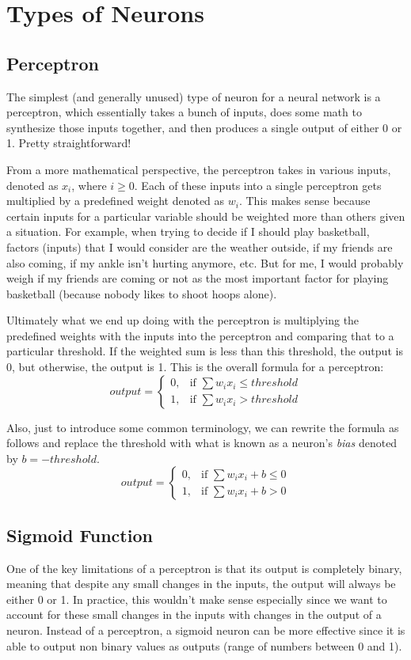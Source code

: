 \documentclass[11pt]{article}
\theoremstyle{definition}
\begin{document}
\section{Types of Neurons}
\subsection{Perceptron}
The simplest (and generally unused) type of neuron for a neural network is a perceptron, which essentially takes a bunch of inputs, does some math to synthesize those inputs together, and then produces a single output of either 0 or 1. Pretty straightforward!

From a more mathematical perspective, the perceptron takes in various inputs, denoted as \(x_i\), where \(i \geq 0\). Each of these inputs into a single perceptron gets multiplied by a predefined weight denoted as \(w_i\). This makes sense because certain inputs for a particular variable should be weighted more than others given a situation. For example, when trying to decide if I should play basketball, factors (inputs) that I would consider are the weather outside, if my friends are also coming, if my ankle isn't hurting anymore, etc. But for me, I would probably weigh if my friends are coming or not as the most important factor for playing basketball (because nobody likes to shoot hoops alone).

Ultimately what we end up doing with the perceptron is multiplying the predefined weights with the inputs into the perceptron and comparing that to a particular threshold. If the weighted sum is less than this threshold, the output is 0, but otherwise, the output is 1. This is the overall formula for a perceptron:
$$
output =
\begin{cases}
0, & \text{if   } \sum w_{i}x_i\leq threshold \\
1, & \text{if   } \sum w_{i}x_i > threshold
\end{cases}
$$

Also, just to introduce some common terminology, we can rewrite the formula as follows and replace the threshold with what is known as a neuron's \textit{bias} denoted by \(b = -threshold\).
$$
output =
\begin{cases}
0, & \text{if   } \sum w_{i}x_i + b\leq 0 \\
1, & \text{if   } \sum w_{i}x_i + b > 0
\end{cases}
$$

\subsection{Sigmoid Function}
One of the key limitations of a perceptron is that its output is completely binary, meaning that despite any small changes in the inputs, the output will always be either 0 or 1. In practice, this wouldn't make sense especially since we want to account for these small changes in the inputs with changes in the output of a neuron. Instead of a perceptron, a sigmoid neuron can be more effective since it is able to output non binary values as outputs (range of numbers between 0 and 1).
\end{document}

